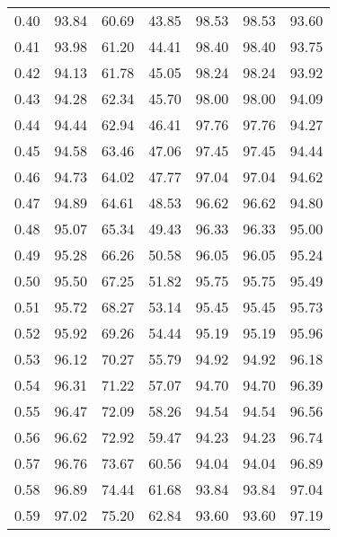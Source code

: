 \begin{tabular}{|c|c|c|c|c|c|c|}
      0.40 &     93.84 &     60.69 &      43.85 &   98.53 &      98.53 &         93.60 \\
      0.41 &     93.98 &     61.20 &      44.41 &   98.40 &      98.40 &         93.75 \\
      0.42 &     94.13 &     61.78 &      45.05 &   98.24 &      98.24 &         93.92 \\
      0.43 &     94.28 &     62.34 &      45.70 &   98.00 &      98.00 &         94.09 \\
      0.44 &     94.44 &     62.94 &      46.41 &   97.76 &      97.76 &         94.27 \\
      0.45 &     94.58 &     63.46 &      47.06 &   97.45 &      97.45 &         94.44 \\
      0.46 &     94.73 &     64.02 &      47.77 &   97.04 &      97.04 &         94.62 \\
      0.47 &     94.89 &     64.61 &      48.53 &   96.62 &      96.62 &         94.80 \\
      0.48 &     95.07 &     65.34 &      49.43 &   96.33 &      96.33 &         95.00 \\
      0.49 &     95.28 &     66.26 &      50.58 &   96.05 &      96.05 &         95.24 \\
      0.50 &     95.50 &     67.25 &      51.82 &   95.75 &      95.75 &         95.49 \\
      0.51 &     95.72 &     68.27 &      53.14 &   95.45 &      95.45 &         95.73 \\
      0.52 &     95.92 &     69.26 &      54.44 &   95.19 &      95.19 &         95.96 \\
      0.53 &     96.12 &     70.27 &      55.79 &   94.92 &      94.92 &         96.18 \\
      0.54 &     96.31 &     71.22 &      57.07 &   94.70 &      94.70 &         96.39 \\
      0.55 &     96.47 &     72.09 &      58.26 &   94.54 &      94.54 &         96.56 \\
      0.56 &     96.62 &     72.92 &      59.47 &   94.23 &      94.23 &         96.74 \\
      0.57 &     96.76 &     73.67 &      60.56 &   94.04 &      94.04 &         96.89 \\
      0.58 &     96.89 &     74.44 &      61.68 &   93.84 &      93.84 &         97.04 \\
      0.59 &     97.02 &     75.20 &      62.84 &   93.60 &      93.60 &         97.19 \\

\end{tabular}
